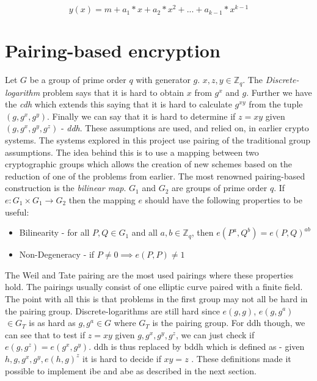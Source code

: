 \begin{equation}
 y(x) = m + a_1*x + a_2*x^2 + ... + a_{k-1} * x^{k-1} 
\end{equation}\label{eq:polynom}



\section{Pairing-based encryption}
Let $G$ be a group of prime order $q$ with generator $g$. $x,z,y \in \mathbb{Z}_q$. The \emph{Discrete-logarithm} problem says that it is hard to obtain $x$ from $g^x$ and $g$. Further we have the \emph{\gls{cdh}} which extends this saying that it is hard to calculate $g^{xy}$ from the tuple $(g, g^x, g^y)$. Finally we can say that it is hard to determine if $z=xy$ given $(g, g^x, g^y, g^z)$ - \emph{\gls{ddh}}. These assumptions are used, and relied on, in earlier crypto systems. The systems explored in this project use pairing of the traditional group assumptions. The idea behind this is to use a mapping between two cryptographic groups which allows the creation of new schemes based on the reduction of one of the problems from earlier. The most renowned pairing-based construction is the \emph{bilinear map}. $G_1$ and $G_2$ are groups of prime order $q$. If $e: G_1 \times G_1 \rightarrow G_2$ then the mapping $e$ should have the following properties to be useful: 
\begin{itemize}
\item Bilinearity - for all $P, Q \in G_1$ and all $a,b \in \mathbb{Z}_q$, then $e(P^a, Q^b) = e(P, Q)^{ab}$
\item Non-Degeneracy - if $P \neq 0 \implies e(P,P) \neq 1$
\end{itemize}
The Weil and Tate pairing are the most used pairings where these properties hold. The pairings usually consist of one elliptic curve paired with a finite field. 
The point with all this is that problems in the first group may not all be hard in the pairing group. Discrete-logarithms are still hard since $e(g,g)$, $e(g,g^a)$ $\in G_T$ is as hard as $g,g^a \in G$ where $G_T$ is the pairing group.
For \gls{ddh} though, we can see that to test if $z=xy$ given $g, g^x, g^y, g^z$, we can just check if $e(g, g^z) = e(g^x, g^y)$. \Gls{ddh} is thus replaced by \gls{bddh} which is defined as - given $h, g, g^x, g^y, e(h,g)^z$ it is hard to decide if $xy = z$ \cite{pairing-survey}. These definitions made it possible to implement \gls{ibe} and \gls{abe} as described in the next section.

